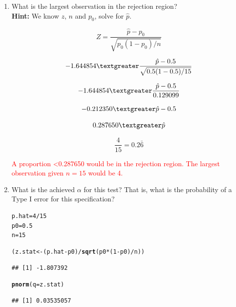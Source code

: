 \documentclass{article}\usepackage[]{graphicx}\usepackage[]{xcolor}
\makeatletter
\newcommand{\hlnum}[1]{\textcolor[rgb]{0.686,0.059,0.569}{#1}}%
\newcommand{\hlopt}[1]{\textcolor[rgb]{0,0,0}{#1}}%
\newcommand{\hldef}[1]{\textcolor[rgb]{0.345,0.345,0.345}{#1}}%
\newcommand{\hlkwb}[1]{\textcolor[rgb]{0.69,0.353,0.396}{#1}}%
\newcommand{\hlkwc}[1]{\textcolor[rgb]{0.333,0.667,0.333}{#1}}%
\newcommand{\hlkwd}[1]{\textcolor[rgb]{0.737,0.353,0.396}{\textbf{#1}}}%
\newenvironment{kframe}{%
 \def\at@end@of@kframe{}%
 \ifinner\ifhmode%
  \def\at@end@of@kframe{\end{minipage}}%
  \begin{minipage}{\columnwidth}%
 \fi\fi%
 \def\FrameCommand##1{\hskip\@totalleftmargin \hskip-\fboxsep
 \colorbox{shadecolor}{##1}\hskip-\fboxsep
     \hskip-\linewidth \hskip-\@totalleftmargin \hskip\columnwidth}%
 \MakeFramed {\advance\hsize-\width
   \@totalleftmargin\z@ \linewidth\hsize
   \@setminipage}}%
 {\par\unskip\endMakeFramed%
 \at@end@of@kframe}
\newenvironment{knitrout}{}{} %
\makeatother
\begin{document}
\begin{enumerate}
\begin{enumerate}
\begin{enumerate}
      \textcolor{red}{Technically this observation is not in the rejection region, as we would consider anything with a probability of \textless 0.05.}
      
      \item What is the largest observation in the rejection region?\\
      
      \textbf{Hint:} We know $z$, $n$ and $p_0$, solve for $\hat{p}$.
      
      \[Z = \frac{\hat{p} - p_{0}}{\sqrt{p_{0}(1-p_{0})/n}} \]
      
      \[-1.644854 \textgreater \frac{\hat{p} - 0.5}{\sqrt{0.5(1-0.5)/15}} \]
      
      \[-1.644854 \textgreater \frac{\hat{p} - 0.5}{0.129099} \]
      
      \[-0.212350 \textgreater \hat{p} - 0.5 \]
            
      \[0.287650 \textgreater \hat{p} \]
      
      \[\frac{4}{15} = 0.2\bar{6} \]
      
      \textcolor{red}{A proportion \textless 0.287650 would be in the rejection region. The largest observation given $n = 15$ would be 4.}
      
      \item What is the achieved $\alpha$ for this test? That is, what 
      is the probability of a Type I error for this specification?
      
\begin{knitrout}\scriptsize
{}\color{fgcolor}\begin{kframe}
\begin{alltt}
      \hldef{p.hat} \hlkwb{=} \hlnum{4}\hlopt{/}\hlnum{15}
      \hldef{p0} \hlkwb{=} \hlnum{0.5}
      \hldef{n} \hlkwb{=} \hlnum{15}

      \hldef{(z.stat} \hlkwb{<-} \hldef{(p.hat} \hlopt{-} \hldef{p0)}\hlopt{/}\hlkwd{sqrt}\hldef{(p0}\hlopt{*}\hldef{(}\hlnum{1}\hlopt{-}\hldef{p0)}\hlopt{/}\hldef{n))}
\end{alltt}
\begin{verbatim}
## [1] -1.807392
\end{verbatim}
\begin{alltt}
      \hlkwd{pnorm}\hldef{(}\hlkwc{q} \hldef{= z.stat)}
\end{alltt}
\begin{verbatim}
## [1] 0.03535057
\end{verbatim}
\end{kframe}
\end{knitrout}
      

\end{enumerate}
\end{enumerate}
\end{enumerate}
\end{document}

